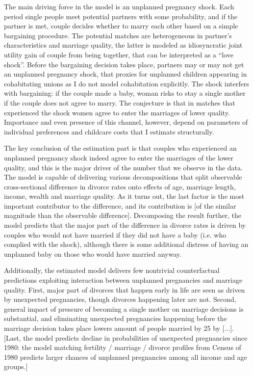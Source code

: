 \documentclass[12pt,letter]{article}
\begin{document}
The main driving force in the model is an unplanned pregnancy shock. Each period single people meet potential partners with some probability, and if the partner is met, couple decides whether to marry each other based on a simple bargaining procedure. The potential matches are heterogeneous in partner's characteristics and marriage quality, the latter is modeled as idiosyncratic joint utility gain of couple from being together, that can be interpreted as a ``love shock''.  Before the bargaining decision takes place, partners may or may not get an unplanned pregnancy shock, that proxies for unplanned children appearing in cohabitating unions as I do not model cohabitation explicitly. The shock interfers with bargaining: if the couple made a baby, woman risks to stay a single mother if the couple does not agree to marry. The conjecture is that in matches that experienced the shock women agree to enter the marriages of lower quality. Importance and even presence of this channel, however, depend on parameters of individual preferences and childcare costs that I estimate structurally.

The key conclusion of the estimation part is that couples who experienced an unplanned pregnancy shock indeed agree to enter the marriages of the lower quality, and this is the major driver of the number that we observe in the data. The model is capable of delivering various decompositions that split observable cross-sectional difference in divorce rates onto effects of age, marriage length, income, wealth and marriage quality. As it turns out, the last factor is the most important contributor to the difference, and its contribution is [of the similar magnitude than the observable difference]. Decomposing the result further, the model predicts that the major part of the difference in divorce rates is driven by couples who would not have married if they did not have a baby (i.e. who complied with the shock), although there is some additional distress of having an unplanned baby on those who would have married anyway.

Additionally, the estimated model delivers few nontrivial counterfactual predictions exploiting interaction between unplanned pregnancies and marriage quality. First, major part of divorces that happen early in life are seen as driven by unexpected pregnancies, though divorces happening later are not. Second, general impact of pressure of becoming a single mother on marriage decisions is substantial, and eliminating unexpected pregnancies happening before the marriage decision takes place lowers amount of people married by 25 by [...]. [Last, the model predicts decline in probabilities of unexpected pregnancies since 1980: the model matching fertility / marriage / divorce profiles from Census of 1980 predicts larger chances of unplanned pregnancies among all income and age groups.]
\end{document}
